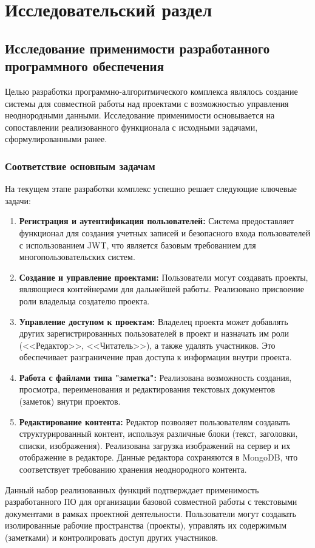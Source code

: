 \chapter{Исследовательский раздел}

\section{Исследование применимости разработанного программного обеспечения}

Целью разработки программно-алгоритмического комплекса являлось создание системы для совместной работы над проектами с возможностью управления неоднородными данными. 
Исследование применимости основывается на сопоставлении реализованного функционала с исходными задачами, сформулированными ранее.

\subsection{Соответствие основным задачам}

На текущем этапе разработки комплекс успешно решает следующие ключевые задачи:

\begin{enumerate}
    \item \textbf{Регистрация и аутентификация пользователей:} Система предоставляет функционал для создания учетных записей и безопасного входа пользователей с использованием JWT, что является базовым требованием для многопользовательских систем.
    \item \textbf{Создание и управление проектами:} Пользователи могут создавать проекты, являющиеся контейнерами для дальнейшей работы. Реализовано присвоение роли владельца создателю проекта.
    \item \textbf{Управление доступом к проектам:} Владелец проекта может добавлять других зарегистрированных пользователей в проект и назначать им роли (<<Редактор>>, <<Читатель>>), а также удалять участников. Это обеспечивает разграничение прав доступа к информации внутри проекта.
    \item \textbf{Работа с файлами типа "заметка":} Реализована возможность создания, просмотра, переименования и редактирования текстовых документов (заметок) внутри проектов.
    \item \textbf{Редактирование контента:} Редактор позволяет пользователям создавать структурированный контент, используя различные блоки (текст, заголовки, списки, изображения). Реализована загрузка изображений на сервер и их отображение в редакторе. Данные редактора сохраняются в MongoDB, что соответствует требованию хранения неоднородного контента.
\end{enumerate}
Данный набор реализованных функций подтверждает применимость разработанного ПО для организации базовой совместной работы с текстовыми документами в рамках проектной деятельности. 
Пользователи могут создавать изолированные рабочие пространства (проекты), управлять их содержимым (заметками) и контролировать доступ других участников.

